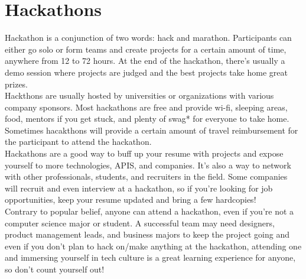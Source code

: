 \documentclass{article}
\begin{document}
\section {Hackathons}
\label{sec:hackathons}
\hspace{0.5cm}Hackathon is a conjunction of two words: hack and marathon. Participants can either go solo or form teams and create projects for a certain amount of time, anywhere from 12 to 72 hours. At the end of the hackathon, there's usually a demo session where projects are judged and the best projects take home great prizes. \\

Hackthons are usually hosted by universities or organizations with various company sponsors. Most hackathons are free and provide wi-fi, sleeping areas, food, mentors if you get stuck, and plenty of swag* for everyone to take home. Sometimes hacakthons will provide a certain amount of travel reimbursement for the participant to attend the hackathon.  \\ 

Hackathons are a good way to buff up your resume with projects and expose yourself to more technologies, APIS, and companies. It's also a way to network with other professionals, students, and recruiters in the field. Some companies will recruit and even interview at a hackathon, so if you're looking for job opportunities, keep your resume updated and bring a few hardcopies! \\ 

Contrary to popular belief, anyone can attend a hackathon, even if you're not a computer science major or student. A successful team may need designers, product management leads, and business majors to keep the project going and even if you don't plan to hack on/make anything at the hackathon, attending one and immersing yourself in tech culture is a great learning experience for anyone, so don't count yourself out!
\end{document}
